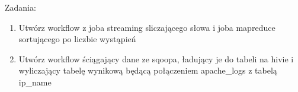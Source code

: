 \documentclass[11pt]{article}
\begin{document}
\pagebreak
Zadania:
\begin{enumerate}
\item Utwórz workflow z joba streaming sliczającego słowa i joba mapreduce sortującego po liczbie wystąpień
\item Utwórz workflow ściągający dane ze sqoopa, ładujący je do tabeli na hivie i wyliczający tabelę wynikową będącą połączeniem apache\_logs z tabelą ip\_name
\end{enumerate}
\end{document}
